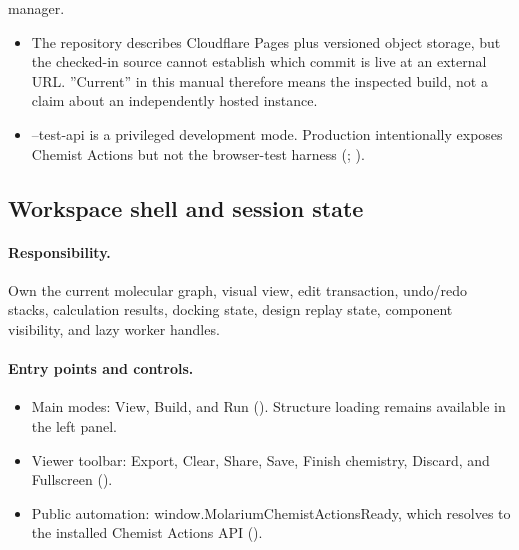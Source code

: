 \documentclass[11pt]{article}
\begin{document}
\begin{small}
\begin{itemize}[leftmargin=*]
\end{itemize}

manager.

\begin{itemize}[leftmargin=*]

\item The repository describes Cloudflare Pages plus versioned object storage, but the checked-in source cannot establish which commit is live at an external URL. ''Current'' in this manual therefore means the inspected build, not a claim about an independently hosted instance.

\item --test-api is a privileged development mode. Production intentionally exposes Chemist Actions but not the browser-test harness (; ).

\end{itemize}

\subsection{Workspace shell and session state}\label{appB:sec3}

\paragraph{Responsibility.}

Own the current molecular graph, visual view, edit transaction, undo/redo stacks, calculation results, docking state, design replay state, component visibility, and lazy worker handles.

\paragraph{Entry points and controls.}

\begin{itemize}[leftmargin=*]

\item Main modes: View, Build, and Run (). Structure loading remains available in the left panel.

\item Viewer toolbar: Export, Clear, Share, Save, Finish chemistry, Discard, and Fullscreen ().

\item Public automation: window.MolariumChemistActionsReady, which resolves to the installed Chemist Actions API ().


\end{itemize}
\end{small}
\end{document}
